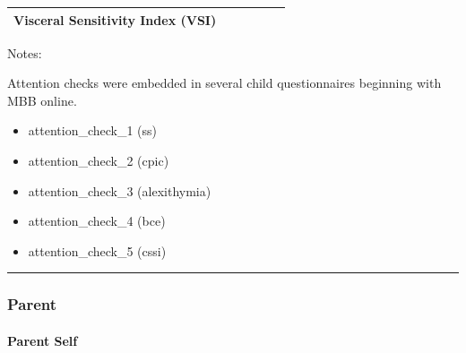 \documentclass[
]{book}
\providecommand{\tightlist}{%
  \setlength{\itemsep}{0pt}\setlength{\parskip}{0pt}}
\begin{document}
\begin{longtable}[]{@{}llllll@{}}
\begin{minipage}[t]{0.18\columnwidth}
Visceral Sensitivity Index (VSI)\strut
\end{minipage} & \begin{minipage}[t]{0.18\columnwidth}\raggedright
\strut
\end{minipage} & \begin{minipage}[t]{0.15\columnwidth}\raggedright
\strut
\end{minipage} & \begin{minipage}[t]{0.16\columnwidth}\raggedright
\strut
\end{minipage} & \begin{minipage}[t]{0.06\columnwidth}\raggedright
\strut
\end{minipage} & \begin{minipage}[t]{0.10\columnwidth}\raggedright
\strut
\end{minipage}\tabularnewline
\bottomrule
\end{longtable}

Notes:

Attention checks were embedded in several child questionnaires beginning with MBB online.

\begin{itemize}
\tightlist
\item
  attention\_check\_1 (ss)
\item
  attention\_check\_2 (cpic)
\item
  attention\_check\_3 (alexithymia)
\item
  attention\_check\_4 (bce)
\item
  attention\_check\_5 (cssi)
\end{itemize}

\begin{center}\rule{0.5\linewidth}{0.5pt}\end{center}

\hypertarget{parent}{%
\subsubsection{Parent}\label{parent}}

\hypertarget{parent-self}{%
\paragraph{Parent Self}\label{parent-self}}
\end{document}
